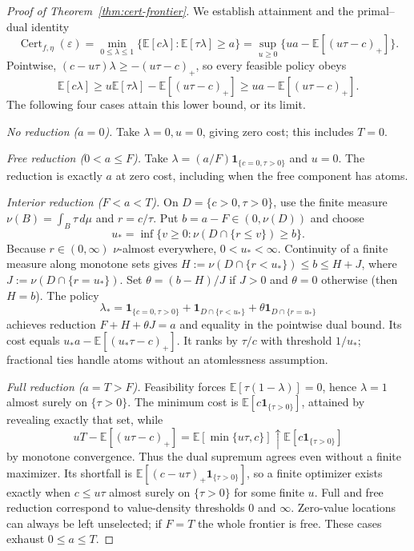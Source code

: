 \begin{proof}[Proof of Theorem~\ref{thm:cert-frontier}]
We establish attainment and the primal--dual identity
\begin{equation}
 \operatorname{Cert}_{f,\eta}(\varepsilon)
 =\min_{0\leq\lambda\leq1}\{\mathbb E[c\lambda]:\mathbb E[\tau\lambda]\geq a\}
 =\sup_{u\geq0}\{ua-\mathbb E[(u\tau-c)_+]\}.
 \label{eq:c-primal-dual}
\end{equation}
Pointwise, $(c-u\tau)\lambda\geq-(u\tau-c)_+$, so every feasible policy obeys
\begin{equation}
 \mathbb E[c\lambda]\geq u\mathbb E[\tau\lambda]-\mathbb E[(u\tau-c)_+]
 \geq ua-\mathbb E[(u\tau-c)_+].\label{eq:c-weak-duality}
\end{equation}
The following four cases attain this lower bound, or its limit.

\emph{No reduction ($a=0$).} Take $\lambda=0,u=0$, giving zero cost; this includes $T=0$.

\emph{Free reduction ($0<a\leq F$).} Take
$\lambda=(a/F)\mathbf1_{\{c=0,\tau>0\}}$ and $u=0$. The reduction is exactly
$a$ at zero cost, including when the free component has atoms.

\emph{Interior reduction ($F<a<T$).} On $D=\{c>0,\tau>0\}$, use the finite
measure $\nu(B)=\int_B\tau\,d\mu$ and $r=c/\tau$. Put $b=a-F\in(0,\nu(D))$
and choose
\begin{equation}
 u_* =\inf\{v\geq0:\nu(D\cap\{r\leq v\})\geq b\}.
 \label{eq:c-weighted-quantile}
\end{equation}
Because $r\in(0,\infty)$ $\nu$-almost everywhere, $0<u_*<\infty$.
Continuity of a finite measure along monotone sets gives
$H:=\nu(D\cap\{r<u_*\})\leq b\leq H+J$, where
$J:=\nu(D\cap\{r=u_*\})$. Set $\theta=(b-H)/J$ if $J>0$ and $\theta=0$
otherwise (then $H=b$). The policy
\begin{equation}
 \lambda_* =\mathbf1_{\{c=0,\tau>0\}}
 +\mathbf1_{D\cap\{r<u_*\}}+\theta\mathbf1_{D\cap\{r=u_*\}}
 \label{eq:c-optimal-policy}
\end{equation}
achieves reduction $F+H+\theta J=a$ and equality in the pointwise dual bound.
Its cost equals $u_*a-\mathbb E[(u_*\tau-c)_+]$. It ranks by $\tau/c$ with
threshold $1/u_*$; fractional ties handle atoms without an atomlessness assumption.

\emph{Full reduction ($a=T>F$).} Feasibility forces
$\mathbb E[\tau(1-\lambda)]=0$, hence $\lambda=1$ almost surely on $\{\tau>0\}$.
The minimum cost is $\mathbb E[c\mathbf1_{\{\tau>0\}}]$, attained by revealing
exactly that set, while
\[
 uT-\mathbb E[(u\tau-c)_+]=\mathbb E[\min\{u\tau,c\}]
 \uparrow\mathbb E[c\mathbf1_{\{\tau>0\}}]
\]
by monotone convergence. Thus the dual supremum agrees even without a finite
maximizer. Its shortfall is $\mathbb E[(c-u\tau)_+\mathbf1_{\{\tau>0\}}]$,
so a finite optimizer exists exactly when $c\leq u\tau$ almost surely on $\{\tau>0\}$ for
some finite $u$. Full and free reduction correspond to value-density thresholds
$0$ and $\infty$. Zero-value locations can always be left unselected; if $F=T$
the whole frontier is free. These cases exhaust $0\leq a\leq T$.
\end{proof}

